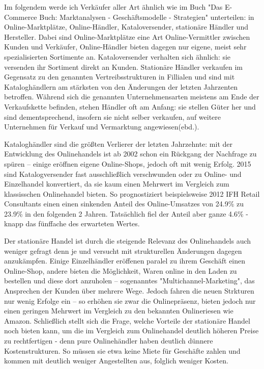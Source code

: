 Im folgendem werde ich Verkäufer aller Art ähnlich wie im Buch "Das E-Commerce Buch: Marktanalysen - Geschäftsmodelle - Strategien" unterteilen: in Online-Marktplätze, Online-Händler, Kataloversender, stationäre Händler und Hersteller\cite[S. 15ff]{Graf}. Dabei sind Online-Marktplätze eine Art Online-Vermittler zwischen Kunden und Verkäufer, Online-Händler bieten dagegen nur eigene, meist sehr spezialisierten Sortimente an. Kataloversender verhalten sich ähnlich: sie versenden ihr Sortiment direkt an Kunden. Stationäre Händler verkaufen im Gegensatz zu den genannten Vertreibsstrukturen in Fillialen und sind mit Kataloghändlern am stärksten von den Änderungen der letzten Jahrzenten betroffen. Während sich die genannten Unternehmensarten meistens am Ende der Verkaufskette befinden, stehen Händler oft am Anfang: sie stellen Güter her und sind dementsprechend, insofern sie nicht selber verkaufen, auf weitere Unternehmen für Verkauf und Vermarktung angewiesen(ebd.). %


Kataloghändler sind die größten Verlierer der letzten Jahrzehnte: mit der Entwicklung des Onlinehandels ist ab 2002 schon ein Rückgang der Nachfrage zu spüren – einige eröffnen eigene Online-Shops\cite[S. 24f]{Graf}, jedoch oft mit wenig Erfolg\cite[S. 38]{Graf}. 2015 sind Katalogversender fast ausschließlich verschwunden oder zu Online- und Einzelhandel konvertiert, da sie kaum einen Mehrwert im Vergleich zum klassisschen Onlinehandel bieten\cite[S. 47]{Graf}. So prognostiziert beispielsweise 2012 IFH Retail Consultants einen einen sinkenden Anteil des Online-Umsatzes von 24.9\% zu 23.9\% in den folgenden 2 Jahren\cite[S. 20]{evilcom}. Tatsächlich fiel der Anteil aber ganze 4.6\% - knapp das fünffache des erwarteten Wertes\cite{statista-vertriebsformen}. %

Der stationäre Handel ist durch die steigende Relevanz des Onlinehandels auch weniger gefragt denn je und versucht mit strukturellen Änderungen dagegen anzukämpfen. Einige Einzelhändler eröffenen paralel zu ihrem Geschäft einen Online-Shop, andere bieten die Möglichkeit, Waren online in den Laden zu bestellen und diese dort anzuholen – sogenanntes "Multichannel-Marketing", das Ansprechen der Kunden über mehrere Wege\cite[S. 34f]{Graf}. Jedoch fahren die neuen Strkturen nur wenig Erfolge ein – so erhöhen sie zwar die Onlinepräsenz, bieten jedoch nur einen geringen Mehrwert im Vergleich zu den bekannten Onlineriesen wie Amazon\cite[S. 34f]{Graf}. 
Schließlich stellt sich die Frage, welche Vorteile der stationäre Handel noch bieten kann, um die im Vergleich zum Onlinehandel deutlich höheren Preise zu rechtfertigen - denn pure Onlinehändler haben deutlich dünnere Kostenstrukturen\cite[S. 14]{evilcom}. So müssen sie etwa keine Miete für Geschäfte zahlen und kommen mit deutlich weniger Angestellten aus, folglich weniger Kosten.

